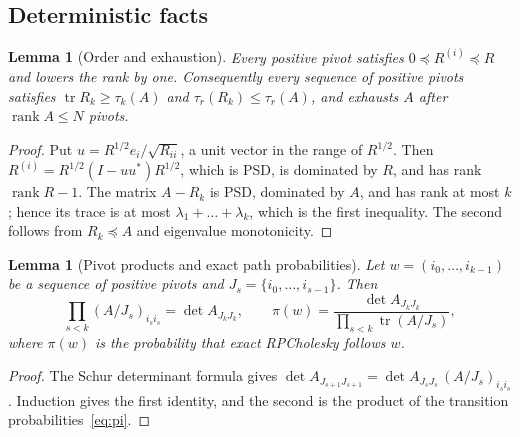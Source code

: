 \documentclass[11pt]{article}
\newtheorem{lemma}[theorem]{Lemma}
\theoremstyle{definition}\newtheorem{definition}[theorem]{Definition}
\theoremstyle{remark}\newtheorem{remark}[theorem]{Remark}
\newcommand{\tr}{\operatorname{tr}}
\newcommand{\rank}{\operatorname{rank}}
\newcommand{\1}{\mathbf 1}
\begin{document}
\subsection{Deterministic facts}
\begin{lemma}[Order and exhaustion]\label{lem:order}
Every positive pivot satisfies $0\preceq R^{(i)}\preceq R$ and lowers
the rank by one. Consequently every sequence of positive pivots
satisfies $\tr R_k\ge\tau_k(A)$ and $\tau_r(R_k)\le\tau_r(A)$, and
exhausts $A$ after $\rank A\le N$ pivots.
\end{lemma}
\begin{proof}
Put $u=R^{1/2}e_i/\sqrt{R_{ii}}$, a unit vector in the range of
$R^{1/2}$. Then $R^{(i)}=R^{1/2}(I-uu^*)R^{1/2}$, which is PSD, is
dominated by $R$, and has rank $\rank R-1$. The matrix $A-R_k$ is PSD,
dominated by $A$, and has rank at most $k$; hence its trace is at most
$\lambda_1+\dots+\lambda_k$, which is the first inequality. The second
follows from $R_k\preceq A$ and eigenvalue monotonicity.
\end{proof}

\begin{lemma}[Pivot products and exact path probabilities]\label{lem:path}
Let $w=(i_0,\dots,i_{k-1})$ be a sequence of positive pivots and
$J_s=\{i_0,\dots,i_{s-1}\}$. Then
\[
 \prod_{s<k}(A/J_s)_{i_si_s}=\det A_{J_kJ_k},\qquad
 \pi(w)=\frac{\det A_{J_kJ_k}}{\prod_{s<k}\tr(A/J_s)},
\]
where $\pi(w)$ is the probability that exact RPCholesky follows $w$.
\end{lemma}
\begin{proof}
The Schur determinant formula gives
$\det A_{J_{s+1}J_{s+1}}=\det A_{J_sJ_s}\,(A/J_s)_{i_si_s}$. Induction
gives the first identity, and the second is the product of the
transition probabilities~\eqref{eq:pi}.
\end{proof}
\end{document}
